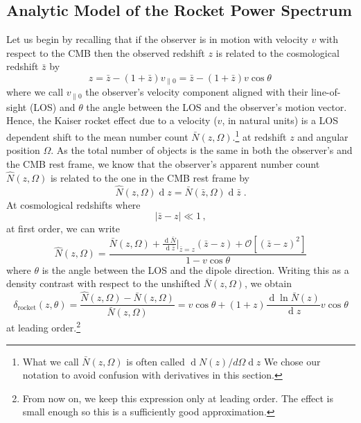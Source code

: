 \documentclass[a4paper,11pt]{article}
\renewcommand{\d}{\operatorname{d}}
\begin{document}
\subsection{Analytic Model of the Rocket Power Spectrum}
\label{sec:model}
Let us begin by recalling  that if the observer is in motion with velocity $v$ with respect to the CMB then the observed redshift $z$ is related to the cosmological redshift $\bar z$ by \cite{Davis:1907.12639}
\begin{equation}
    z = \bar z - (1 + \bar z) v_{\parallel 0} = \bar z - (1 + \bar z) v\cos\theta\,
    \label{eq:z_shift}
\end{equation}
where we call ${v}_{\parallel 0}$ the observer's velocity component aligned with their line-of-sight (LOS) and $\theta$ the angle between the LOS and the observer's motion vector.
Hence, the Kaiser rocket effect due to  a velocity ($v$, in natural units) is a LOS dependent shift to the mean number count $\bar N(z, \Omega)$.\footnote{What we call $\bar N(z, \Omega)$ is often called ${\d N(z)}/{d\Omega\d z}$ We chose our notation to avoid confusion with derivatives in this section.} at redshift $z$ and angular position $\Omega$. As the total number of objects is the same in both the observer's and  the CMB rest frame, we know that the observer's apparent number count $\hat N(z, \Omega)$ is related to the one in the CMB rest frame  by \begin{equation} \hat N(z, \Omega)\d z = \bar N(\bar z, \Omega)\d\bar z\;.
\end{equation}
At cosmological redshifts where $$\left\vert\bar z - z\right\vert\ll 1\, ,$$  at first order, we can write
\begin{equation}
    \hat N(z,\Omega) = \frac{\bar N(z,\Omega)+\frac{\d\bar N}{\d\bar z}\Big|_{\bar z=z}\left(\bar z - z\right) + \mathcal{O}\left[\left(\bar z - z\right)^2\right]}{1 - v\cos\theta}
    \label{eq:nbar_dipole}
\end{equation}
where $\theta$ is the angle between the LOS and the dipole direction. Writing this as a density contrast with respect to the unshifted $\bar N(z,\Omega)$, we obtain 
\begin{equation}
  \delta_\mathrm{rocket}(z,\theta)=\frac{\hat N( z,\Omega)-\bar N(z,\Omega)}{\bar N(z, \Omega)}=v\cos\theta + (1+z)\frac{\d \ln\bar N(z)}{\d z}v\cos\theta
  \label{eq:delta_rocket_z}
\end{equation}
at leading order.\footnote{From now on, we keep this expression only at leading order. The effect is small enough so this is a sufficiently good approximation.}
\end{document}
